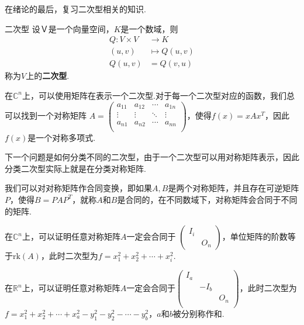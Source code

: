 在绪论的最后，复习二次型相关的知识.\par

\begin{definition}{二次型}
    设$Ｖ$是一个向量空间，$K$是一个数域，则
   \begin{align*}
       Q:V\times V &\to K \\
       (u,v) &\mapsto Q(u,v) \\
       Q(u,v)&=Q(v,u)
   \end{align*}称为$V$上的\textbf{二次型}.
\end{definition}
在$\mathbb{C}^n$上，可以使用矩阵在表示一个二次型.对于每一个二次型对应的函数，我们总可以找到一个对称矩阵
$A=\begin{pmatrix}
    a_{11} & a_{12} & \cdots & a_{1n} \\
    \vdots & \vdots & \ddots & \vdots \\
    a_{n1} & a_{n2} & \cdots & a_{nn} \\
\end{pmatrix}$，使得$f(x)=xAx^T$，因此$f(x)$是一个对称多项式.\par
下一个问题是如何分类不同的二次型，由于一个二次型可以用对称矩阵表示，因此分类二次型实际上就是在分类对称矩阵.\par
我们可以对对称矩阵作合同变换，即如果$A,B$是两个对称矩阵，并且存在可逆矩阵$P$，使得$B=PAP^T$，就称$A$和$B$是合同的，在不同数域下，对称矩阵会合同于不同的矩阵.\par
在$\mathbb{C}^n$上，可以证明任意对称矩阵$A$一定会合同于
$\begin{pmatrix}
    I_{i} & \\
    & O_n
\end{pmatrix}$，单位矩阵的阶数等于$\mathrm{rk}(A)$，此时二次型为$f=x_1^2+x_2^2+\cdots+x_i^2$.\par
在$\mathbb{R}^n$上，可以证明任意对称矩阵$A$一定会合同于$\begin{pmatrix}
    I_a & & \\
    & -I_b & \\
    & & O_n \\
\end{pmatrix}$，此时二次型为$f=x_1^2+x_2^2+\cdots+x_a^2-y_1^2-y_2^2-\cdots-y_b^2$，$a$和$b$被分别称作和.
